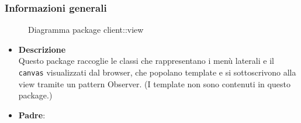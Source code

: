 \subsubsection{Informazioni generali}
\begin{figure}[H]
	\caption{Diagramma package client::view}
\end{figure}
\begin{itemize}
\item \textbf{Descrizione}\\
Questo package raccoglie le classi che rappresentano i menù laterali e il \texttt{canvas} visualizzati dal browser, che popolano template e si sottoscrivono alla view tramite un pattern Observer. (I template non sono contenuti in questo package.)
\item \textbf{Padre}: \hyperref[\nogloxy{swedesigner::client}]{}
\end{itemize}
